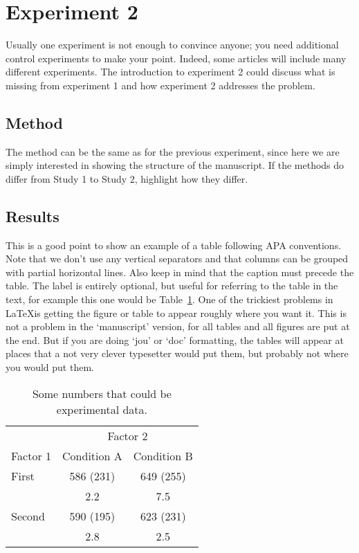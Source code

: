\documentclass[jou]{apa}%
\begin{document}
\section{Experiment 2}
Usually one experiment is not enough to convince anyone; you need additional control experiments to make your point.  Indeed, some articles will include many different experiments. %
The introduction to experiment 2 could discuss what is missing from experiment 1 and how experiment 2 addresses the problem.


\subsection{Method}
The method can be the same as for the previous experiment, since here we are simply interested in showing the structure of the manuscript.  %
If the methods do differ from Study 1 to Study 2, highlight how they differ.
\subsection{Results}
This is a good point to show an example of a table following APA conventions. Note that we don't use any vertical separators and that columns can be grouped with partial horizontal lines.  
Also keep in mind that the caption must precede the table. The label is entirely optional, but useful for referring to the table in the text, for example this one would be Table~\ref{tab:tab1}. One of the trickiest problems in \LaTeX is getting the figure or table to appear roughly where you want it.  This is not a problem in the `manuscript' version, for all tables and all figures are put at the end.  But if you are doing `jou' or `doc' formatting, the tables will appear at places that a not very clever  typesetter would put them, but probably not where you would put them.

\begin{table}[tbp]
\caption{Some numbers that could be experimental data.}
\label{tab:tab1}
\begin{tabular}{lcc}\hline
          & \multicolumn{2}{c}{Factor 2} \\ \cline{2-3}
Factor 1  & Condition A  & Condition B   \\ \hline
First     & 586 (231)    & 649 (255)     \\
          &    2.2       &    7.5        \\
Second    & 590 (195)    & 623 (231)     \\
          &    2.8       &    2.5        \\ \hline
\end{tabular}
\end{table}  
\end{document}
